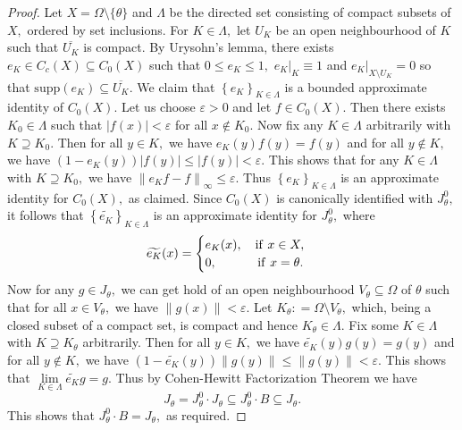 \documentclass[a4paper,11pt,reqno]{amsart}
\theoremstyle{plain}
\theoremstyle{mainthmstyle}
\theoremstyle{named}
\numberwithin{equation}{section}
\begin{document}
\begin{proof}
Let $X = \Omega \setminus \{\theta\}$ and $\Lambda$ be the directed set consisting of compact subsets of $X,$ ordered by set inclusions. For $K \in \Lambda,$ let $U_K$ be an open neighbourhood of $K$ such that $\overline {U_K}$ is compact. By Urysohn's lemma, there exists $e_K \in C_c (X) \subseteq C_0 (X)$ such that $0 \leq e_K \leq 1,$ $e_K \rvert_{K} \equiv 1$ and $e_K \rvert_{X \setminus U_K} = 0$ so that $\mathrm {supp} \left (e_K \right ) \subseteq \overline {U_K}.$ We claim that $\left \{e_K \right \}_{K \in \Lambda}$ is a bounded approximate identity of $C_0 (X).$ Let us choose $\varepsilon > 0$ and let $f \in C_0 (X).$ Then there exists $K_0 \in \Lambda$ such that $\left \lvert f (x) \right \rvert < \varepsilon$ for all $x \notin K_0.$ Now fix any $K \in \Lambda$ arbitrarily with $K \supseteq K_0.$ Then for all $y \in K,$ we have $e_K (y) f (y) = f (y)$ and for all $y \notin K,$ we have $\left (1 - e_K (y) \right ) \left \lvert f (y) \right \rvert \leq \left \lvert f (y) \right \rvert < \varepsilon.$ This shows that for any $K \in \Lambda$ with $K \supseteq K_0,$ we have $\left \|e_K f - f \right \|_{\infty} \leq \varepsilon.$ Thus $\left \{e_K \right \}_{K \in \Lambda}$ is an approximate identity for $C_0 (X),$ as claimed. Since $C_0 (X)$ is canonically identified with $J_{\theta}^{0},$ it follows that $\left \{\widetilde {e_K} \right \}_{K \in \Lambda}$ is an approximate identity for $J_{\theta}^{0},$ where
$$\widetilde {e_K} (x) = \begin{cases} e_K (x), \quad \mathrm{if}\ x \in X, \\ 0, \quad \hspace{8mm} \mathrm{if}\ x = \theta. \end{cases}$$
Now for any $g \in J_{\theta},$ we can get hold of an open neighbourhood $V_{\theta} \subseteq \Omega$ of $\theta$ such that for all $x \in V_{\theta},$ we have $\left \|g (x) \right \| < \varepsilon.$ Let $K_{\theta} : = \Omega \setminus V_{\theta},$ which, being a closed subset of a compact set, is compact and hence $K_{\theta} \in \Lambda.$ Fix some $K \in \Lambda$ with $K \supseteq K_{\theta}$ arbitrarily. Then for all $y \in K,$ we have $\widetilde {e_K} (y) g (y) = g (y)$ and for all $y \notin K,$ we have $\left (1 - \widetilde {e_K} (y) \right ) \left \|g (y) \right \| \leq \left \|g (y) \right \| < \varepsilon.$ This shows that $\lim\limits_{K \in \Lambda} \widetilde {e_K} g = g.$ Thus by Cohen-Hewitt Factorization Theorem we have 
$$J_{\theta} = J_{\theta}^{0} \cdot J_{\theta} \subseteq J_{\theta}^{0} \cdot B \subseteq J_{\theta}.$$ This shows that $J_{\theta}^{0} \cdot B = J_{\theta},$ as required.
\end{proof}
\end{document}
